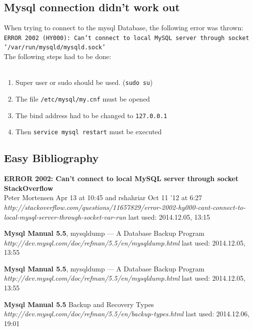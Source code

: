 \documentclass[10pt]{article}
\begin{document}
\subsection{Mysql connection didn't work out}
When trying to connect to the mysql Database, the following error was thrown:
\texttt{ERROR 2002 (HY000): Can't connect to local MySQL server through socket '/var/run/mysqld/mysqld.sock'} \\
The following steps had to be done: \\
\\ 
\begin{enumerate}
\item Super user or sudo should be used. (\texttt{sudo su}) 
\item The file \texttt{/etc/mysql/my.cnf} must be opened 
\item The bind address had to be changed to \texttt{127.0.0.1}
\item Then \texttt{service mysql restart} must be executed
\end{enumerate}
\cite{mysqlProblem1}



\subsection{Easy Bibliography}
\begin{thebibliography}{56}

  
  \textbf{ERROR 2002: Can't connect to local MySQL server through socket \\ StackOverflow} \\ Peter Mortensen Apr 13 at 10:45 and  rshahriar Oct 11 '12 at 6:27 \\
  \textit{http://stackoverflow.com/questions/11657829/error-2002-hy000-cant-connect-to-local-mysql-server-through-socket-var-run}
  \newline last used: 2014.12.05, 13:15
 
  \textbf{Mysql Manual 5.5}, mysqldump — A Database Backup Program\\
  \textit{http://dev.mysql.com/doc/refman/5.5/en/mysqldump.html}
  \newline last used: 2014.12.05, 13:55
  
  \textbf{Mysql Manual 5.5}, mysqldump — A Database Backup Program\\
  \textit{http://dev.mysql.com/doc/refman/5.5/en/mysqldump.html}
  \newline last used: 2014.12.05, 13:55
  
  \textbf{Mysql Manual 5.5} Backup and Recovery Types\\
  \textit{http://dev.mysql.com/doc/refman/5.5/en/backup-types.html}
  \newline last used: 2014.12.06, 19:01
  


\end{thebibliography}
\end{document}
